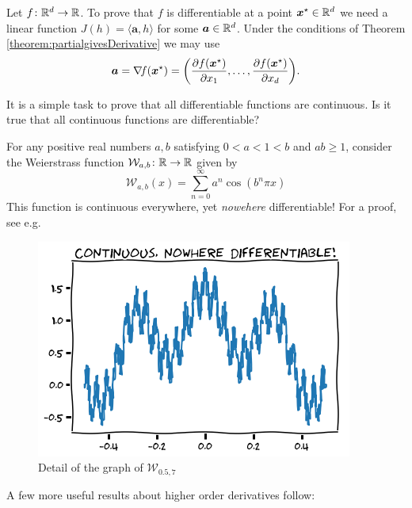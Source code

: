 \begin{example}\label{example:gradient}
Let $f\colon \mathbb{R}^d \to \mathbb{R}$.  To prove that $f$ is differentiable at a point $\boldsymbol{x}^{\star} \in \mathbb{R}^d$ we need a linear function $J(h) = \langle \boldsymbol{a}, h \rangle$ for some $\boldsymbol{a} \in \mathbb{R}^d$.  Under the conditions of Theorem \ref{theorem:partialgivesDerivative} we may use
\begin{equation*}
\boldsymbol{a} = \mathop{\nabla\! {f}}(\boldsymbol{x}^{\star})= \bigg( \frac{\partial f (\boldsymbol{x}^{\star})}{\partial x_1}, \dotsc, \frac{\partial f (\boldsymbol{x}^{\star})}{\partial x_d} \bigg).
\end{equation*}
\end{example}

\separator 

It is a simple task to prove that all differentiable functions are continuous.  Is it true that all continuous functions are differentiable?

\begin{example}\label{example:WeierstrassFunction}
For any positive real numbers $a, b$ satisfying $0<a<1<b$ and $ab \geq 1$, consider the Weierstrass function $\mathcal{W}_{a,b} \colon \mathbb{R} \to \mathbb{R}$ given by 
\begin{equation*}
\mathcal{W}_{a,b}(x) = \sum_{n=0}^\infty a^n \cos(b^n \pi x)
\end{equation*}
This function is continuous everywhere, yet \emph{nowehere} differentiable!  For a proof, see e.g.~\cite{hardy1916weierstrass}
\begin{figure}[ht!]
\includegraphics[width=0.6\linewidth]{images/weierstrass.png}
\caption{Detail of the graph of $\mathcal{W}_{0.5, 7}$}
\label{figure:WeierstrassFunction}
\end{figure}
\end{example}

\separator

A few more useful results about higher order derivatives follow:

